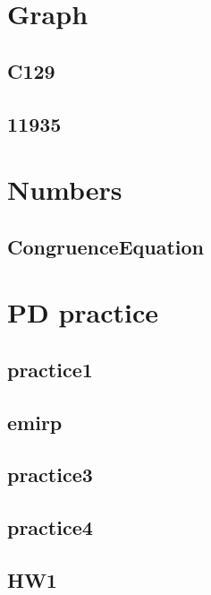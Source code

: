 

\section{Graph}
    \subsection{C129}
        
    \subsection{11935}
        

\section{Numbers}
    \subsection{CongruenceEquation}
        

\section{PD practice}
    \subsection{practice1}
        
    \subsection{emirp}
        
    \subsection{practice3}
        
    \subsection{practice4}
        
    \subsection{HW1}
        

